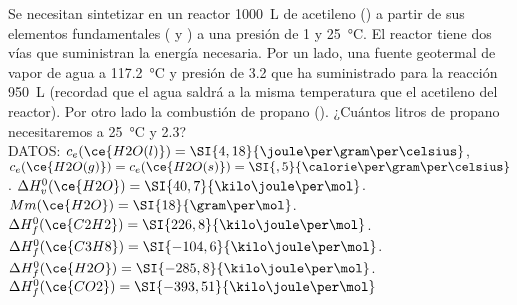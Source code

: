 Se necesitan sintetizar en un reactor \SI{1000}{\liter} de acetileno () a partir de sus elementos fundamentales ( y ) a una presión de \SI{1}{\atm} y \SI{25}{\celsius}. El reactor tiene dos vías que suministran la energía necesaria. Por un lado, una fuente geotermal de vapor de agua a \SI{117,2}{\celsius} y presión de \SI{3,2}{\atm} que ha suministrado para la reacción \SI{950}{\liter} (recordad que el agua saldrá a la misma temperatura que el acetileno del reactor). Por otro lado la combustión de propano (). ¿Cuántos litros de propano necesitaremos a \SI{25}{\celsius} y \SI{2,3}{\atm}?\\[.3cm]
DATOS: $c_e(\ce{H2O(l)})=\SI{4,18}{\joule\per\gram\per\celsius}$, $c_e(\ce{H2O(g)})=c_e(\ce{H2O(s)})=\SI{,5}{\calorie\per\gram\per\celsius}$. $\Delta H_v^0(\ce{H2O})=\SI{40,7}{\kilo\joule\per\mol}$. $Mm(\ce{H2O})=\SI{18}{\gram\per\mol}$. $\Delta H_f^0(\ce{C2H2})= \SI{226,8}{\kilo\joule\per\mol}$. $\Delta H_f^0(\ce{C3H8}) = \SI{-104,6}{\kilo\joule\per\mol}$. $\Delta H_f^0(\ce{H2O}) = \SI{-285,8}{\kilo\joule\per\mol}$.\\$\Delta H_f^0(\ce{CO2}) = \SI{-393,51}{\kilo\joule\per\mol}$
